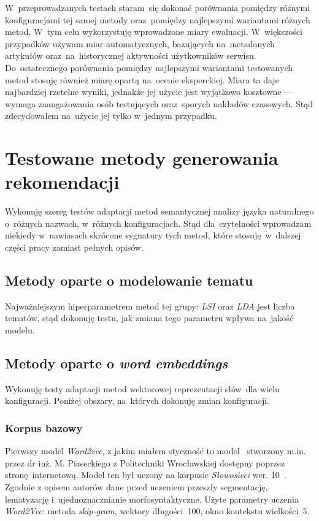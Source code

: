 \documentclass[pl]{minipw} %
\begin{document}
W~przeprowadzanych testach staram~się dokonać porównania pomiędzy różnymi konfiguracjami tej samej metody oraz~pomiędzy najlepszymi wariantami różnych metod. W~tym celu wykorzystuję wprowadzone miary ewaluacji. W~większości przypadków używam miar automatycznych, bazujących na~metadanych artykułów oraz~na~historycznej aktywności użytkowników serwisu. Do~ostatecznego porównania pomiędzy najlepszymi wariantami testowanych metod stosuję również miarę opartą na~ocenie eksperckiej. Miara ta daje najbardziej rzetelne wyniki, jednakże jej użycie jest wyjątkowo kosztowne --- wymaga zaangażowania osób testujących oraz~sporych nakładów czasowych. Stąd zdecydowałem na~użycie jej tylko w~jednym przypadku.

\section{Testowane metody generowania rekomendacji}

Wykonuję szereg testów adaptacji metod semantycznej analizy języka naturalnego o~różnych nazwach, w~różnych konfiguracjach. Stąd dla~czytelności wprowadzam niekiedy w~nawiasach skrócone sygnatury tych metod, które stosuję w~dalszej części pracy zamiast pełnych opisów.

\subsection{Metody oparte o modelowanie tematu}

Najważniejszym hiperparametrem metod tej grupy: \textit{LSI} oraz \textit{LDA} jest liczba tematów, stąd dokonuję testu, jak zmiana tego parametru wpływa na~jakość modelu.

\subsection{Metody oparte o \textit{word embeddings}}
Wykonuję testy adaptacji metod wektorowej reprezentacji słów~dla wielu konfiguracji. Poniżej obszary, na~których dokonuję zmian konfiguracji.

\subsubsection{Korpus bazowy}

Pierwszy model \textit{Word2vec}, z jakim miałem styczność to model~\cite{pias} stworzony m.in. przez dr inż. M. Piaseckiego z Politechniki Wrocławskiej dostępny poprzez stronę internetową. Model ten był uczony na korpusie \textit{Słowosieci} wer. 10~\cite{wordnet}. Zgodnie z opisem autorów dane przed uczeniem  przeszły segmentację, lematyzację i~ujednoznacznianie morfosyntaktyczne. Użyte parametry uczenia \textit{Word2Vec}: metoda \textit{skip-gram}, wektory długości~100, okno kontekstu wielkości~5.
\end{document}
